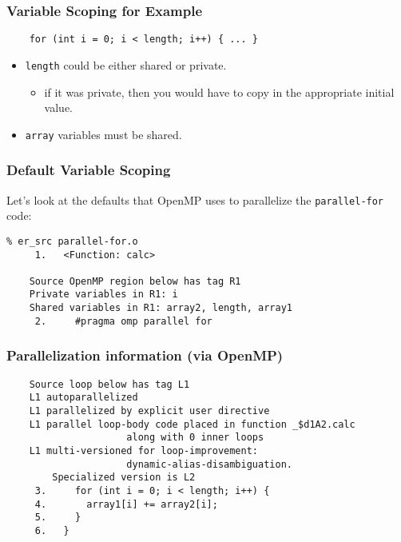 \begin{frame}[fragile]
  \frametitle{Variable Scoping for Example}

  

\begin{verbatim}
    for (int i = 0; i < length; i++) { ... }
\end{verbatim}

\large
  \begin{itemize}
    \item {\tt length} could be either shared or private.
    \begin{itemize}
      \item if it was private, then you would have to copy
in the appropriate initial value.
    \end{itemize}
    \item {\tt array} variables must be shared.
  \end{itemize}
  

\end{frame}


\begin{frame}[fragile]
  \frametitle{Default Variable Scoping}
  
Let's look at the defaults that OpenMP uses to parallelize the {\tt parallel-for} code:
\begin{lstlisting}
% er_src parallel-for.o
     1.   <Function: calc>
    
    Source OpenMP region below has tag R1
    Private variables in R1: i
    Shared variables in R1: array2, length, array1
     2.     #pragma omp parallel for
\end{lstlisting}
  

\end{frame}


\begin{frame}[fragile]
  \frametitle{Parallelization information (via OpenMP)}
\begin{lstlisting}
    Source loop below has tag L1
    L1 autoparallelized
    L1 parallelized by explicit user directive
    L1 parallel loop-body code placed in function _$d1A2.calc 
                     along with 0 inner loops
    L1 multi-versioned for loop-improvement:
                     dynamic-alias-disambiguation. 
        Specialized version is L2
     3.     for (int i = 0; i < length; i++) {
     4.       array1[i] += array2[i];
     5.     }
     6.   }
\end{lstlisting}

\end{frame}

